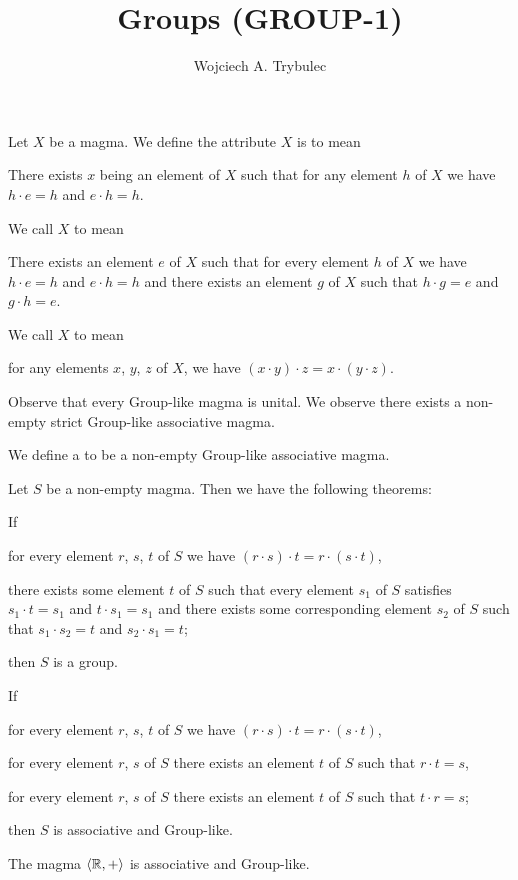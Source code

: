 \documentclass{article}
\title{Groups (GROUP-1)}
\author{Wojciech A. Trybulec}
\begin{document}
\maketitle
\begin{definition}
Let $X$ be a magma. We define the attribute $X$ is  to
mean
\begin{defn}
\item There exists $x$ being an element of $X$ such that for any element
  $h$ of $X$ we have $h\cdot e=h$ and $e\cdot h=h$.
\end{defn}
We call $X$  to mean
\begin{defn}
\item There exists an element $e$ of $X$ such that for every element $h$
  of $X$ we have $h\cdot e=h$ and $e\cdot h=h$ and there exists an element $g$ of
  $X$ such that $h\cdot g=e$ and $g\cdot h=e$.
\end{defn}
We call $X$  to mean
\begin{defn}
\item for any elements $x$, $y$, $z$ of $X$, we have $(x\cdot y)\cdot z=x\cdot (y\cdot z)$.
\end{defn}
\end{definition}

Observe that every Group-like magma is unital. We observe there exists a
non-empty  strict Group-like associative magma.

\begin{definition}
We define a  to be a non-empty Group-like associative magma.
\end{definition}

Let $S$ be a non-empty magma. Then we have the following theorems:
\begin{thm}
\item\label{group1:1} If \begin{enumerate*}[label=(\roman*)]
\item for every element $r$, $s$, $t$ of $S$ we have $(r\cdot s)\cdot t=r\cdot (s\cdot t)$,
\item there exists some element $t$ of $S$ such that every element
  $s_{1}$ of $S$ satisfies $s_{1}\cdot t=s_{1}$ and $t\cdot s_{1}=s_{1}$ and there
  exists some corresponding element $s_{2}$ of $S$ such that $s_{1}\cdot s_{2}=t$ and $s_{2}\cdot s_{1}=t$;
\end{enumerate*}
  then $S$ is a group.
\item\label{group1:2} If \begin{enumerate*}[label=(\roman*)]
\item for every element $r$, $s$, $t$ of $S$ we have $(r\cdot s)\cdot t=r\cdot (s\cdot t)$,
\item for every element $r$, $s$ of $S$ there exists an element $t$ of
  $S$ such that $r\cdot t=s$,
\item for every element $r$, $s$ of $S$ there exists an element $t$ of
  $S$ such that $t\cdot r=s$;
\end{enumerate*}
  then $S$ is associative and Group-like.
\item\label{group1:3} The magma $\langle \mathbb{R},+\rangle$ is associative
  and Group-like.
\end{thm}
\end{document}
